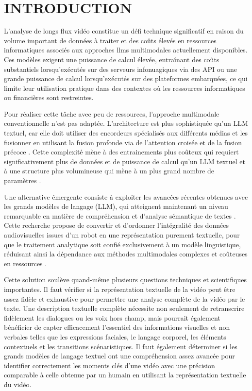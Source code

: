 \documentclass[livre]{udes-genie-these}
\begin{document}
\chapter{INTRODUCTION}

L’analyse de longs flux vidéo constitue un défi technique significatif en raison du volume important de données à traiter et des coûts élevés en ressources informatiques associés aux approches llms multimodales actuellement disponibles. Ces modèles exigent une puissance de calcul élevée, entraînant des coûts substantiels lorsqu’exécutés sur des serveurs infonuagiques via des API ou une grande puissance de calcul lorsqu’exécutés sur des plateformes embarquées, ce qui limite leur utilisation pratique dans des contextes où les ressources informatiques ou financières sont restreintes. 

Pour réaliser cette tâche avec peu de ressources, l'approche multimodale conventionnelle n’est pas adaptée. L’architecture est plus sophistiquée qu’un LLM textuel, car elle doit utiliser des encordeurs spécialisés aux différents médias et les fusionner en utilisant la fusion profonde via de l’attention croisée et de la fusion précoce \cite{wadekar2024_evolution_of_multimodal_model_architectures}. Cette complexité mène à des entrainements plus coûteux qui requiert significativement plus de données et de puissance de calcul qu’un LLM textuel et à une structure plus volumineuse qui mène à un plus grand nombre de paramètres \cite{liang2025_mixture_of_transformers}. 

Une alternative émergente consiste à exploiter les avancées récentes obtenues avec les grands modèles de langage (LLM), qui atteignent maintenant un niveau remarquable en matière de compréhension et d'analyse sémantique de textes \cite{zheng2023gptfathom}. Cette recherche propose de convertir et d’ordonner l'intégralité des données audiovisuelles issues d'un robot en une représentation purement textuelle, pour que le traitement analytique soit confié exclusivement à un modèle linguistique, réduisant ainsi la dépendance aux méthodes multimodales complexes et coûteuses en ressources \cite{liang2025_mixture_of_transformers}.

Cette solution soulève quand-même plusieurs questions techniques et scientifiques importantes. Il faut vérifier si la représentation textuelle de la vidéo peut être assez fidèle et exhaustive pour permettre une analyse complète de la vidéo par le texte. Une description textuelle complète nécessite non seulement de retranscrire fidèlement les dialogues ou les voix hors champ, mais pourrait également bénéficier de capter efficacement l’essentiel des informations visuelles et non verbales telles que les expressions faciales, le langage corporel, les éléments contextuels et les transitions scénaristiques. Il faut également déterminer si les grands modèles de langage textuel ont une compréhension assez avancée pour identifier correctement les moments clés d'une vidéo avec une précision comparable à celle obtenue par un humain en utilisant la représentation textuelle du vidéo. 
\end{document}
